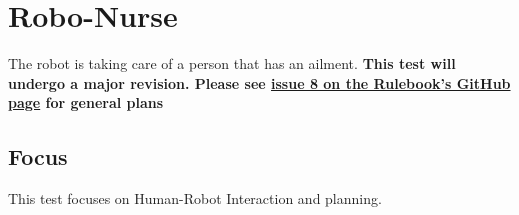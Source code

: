 \section{Robo-Nurse}

The robot is taking care of a person that has an ailment. 
\textbf{This test will undergo a major revision. 
Please see \href{https://github.com/RCAtHome2015/RuleBook/issues/8}{issue 8 on the Rulebook's GitHub page} for general plans}

% 

\subsection{Focus}

This test focuses on Human-Robot Interaction and planning.

